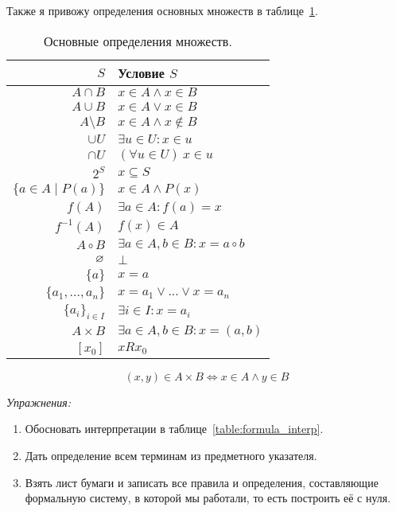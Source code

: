 Также я привожу определения основных множеств в таблице~\ref{table:set_def}.

\begin{table}
	\centering
	\begin{tabular}{r|l}
		$S$                        & Условие $S$                        \\\hline
		$A\cap B$                  & $x\in A\land x\in B$               \\
		$A\cup B$                  & $x\in A\lor x\in B$                \\
		$A\setminus B$             & $x\in A \land x\notin B$           \\
		$\cup U$                   & $\exists u\in U:x\in u$            \\
		$\cap U$                   & $(\forall u\in U)~x\in u$          \\
		$2^{S}$                    & $x\subseteq S$                     \\
		$\{a\in A\;\big|\; P(a)\}$ & $x\in A\land P(x)$                 \\
		$f(A)$                     & $\exists a\in A:f(a)=x$            \\
		$f^{-1}(A)$                & $f(x)\in A$                        \\
		$A\circ B$                 & $\exists a\in A,b\in B:x=a\circ b$ \\
		$\varnothing$                    & $\bot$                             \\
		$\{a\}$                    & $x=a$                              \\
		$\{a_1,...,a_{n}\}$        & $x=a_1\lor ...\lor x=a_{n}$        \\
		$\{a_{i}\}_{i\in I}$       & $\exists i\in I:x=a_{i}$           \\
		$A\times B$                & $\exists a\in A,b\in B:x=(a,b)$    \\
		$[x_0]$                    & $xRx_0$
	\end{tabular}

	\[
		(x,y)\in A\times B\iff x\in A\land y\in B
	\]

	\caption{Основные определения множеств.}\label{table:set_def}
\end{table}

\vspace{1em}
{\it Упражнения:}
\begin{enumerate}
	\item{}Обосновать интерпретации в таблице~\ref{table:formula_interp}.
	\item{}Дать определение всем терминам из предметного указателя.
	\item{}Взять лист бумаги и записать все правила и определения, составляющие
	формальную систему, в которой мы работали, то есть построить её с нуля.
\end{enumerate}
